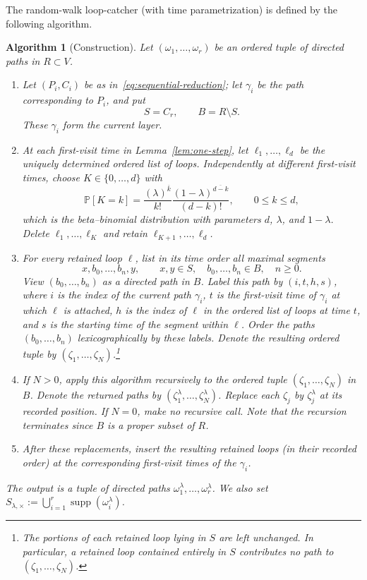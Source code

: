 \documentclass[11pt]{article}
\numberwithin{equation}{section}
\newcommand{\1}{\mathbf{1}}
\newtheorem{algorithm}[theorem]{Algorithm}
\newcommand{\supp}{\operatorname{supp}}
\newcommand{\Prob}{\mathbb P}
\begin{document}
The random-walk loop-catcher (with time parametrization) is defined by the following algorithm.
\begin{algorithm}[Construction]
\label{alg:time-catcher} Let $(\omega_1,\ldots,\omega_r)$ be an ordered tuple of directed paths in $R\subset V$.

\begin{enumerate}[label=\textup{(\arabic*)},leftmargin=2.4em]
\item Let $(P_i,C_i)$ be as in~\eqref{eq:sequential-reduction}; let $\gamma_i$
be the path corresponding to $P_i$, and put
\[
 S=C_r,\qquad B=R\setminus S.
\]
These $\gamma_i$ form the current layer.\label{alg:1}

\item At each first-visit time in Lemma~\ref{lem:one-step}, let
$\ell_1,\ldots,\ell_d$ be the uniquely determined ordered list of loops.  Independently
at different first-visit times, choose $K\in\{0,\ldots,d\}$ with
\begin{equation}\label{eq:initial-block-law}
 \Prob[K=k]
 =\frac{(\lambda)^{\overline k}}{k!}
  \frac{(1-\lambda)^{\overline{d-k}}}{(d-k)!},
 \qquad 0\le k\le d,
\end{equation}
which is the beta--binomial distribution with parameters $d$, $\lambda$, and $1-\lambda$.
Delete $\ell_1,\ldots,\ell_K$ and retain
$\ell_{K+1},\ldots,\ell_d$.\label{alg:2}

\item For every retained loop $\ell$, list in its time order all maximal
segments
\[
 x,b_0,\ldots,b_n,y,
 \qquad x,y\in S,\quad b_0,\ldots,b_n\in B,\quad n\ge0.
\]
View $(b_0,\ldots,b_n)$ as a directed path in $B$. Label
this path by $(i,t,h,s)$, where $i$ is the index of the current path
$\gamma_i$, $t$ is the first-visit time of $\gamma_i$ at which $\ell$ is
attached, $h$ is the index of $\ell$ in the ordered list of loops at time $t$, and $s$ is the starting time of the segment within $\ell$. Order the paths $(b_0,\ldots,b_n)$ lexicographically by these
labels. Denote the resulting ordered tuple by
$(\zeta_1,\ldots,\zeta_N)$.\footnote{The portions of each retained loop lying in $S$ are left unchanged. In particular, a retained loop contained entirely in $S$ contributes no path to $(\zeta_1,\ldots,\zeta_N)$.}\label{alg:3}

\item If $N>0$, apply this algorithm recursively to the ordered
tuple $(\zeta_1,\ldots,\zeta_N)$ in $B$.  Denote the returned paths by
$(\zeta_1^\lambda,\ldots,\zeta_N^\lambda)$.  Replace each $\zeta_j$ by
$\zeta_j^\lambda$ at its recorded position.  If $N=0$, make no recursive
call. Note that the recursion terminates since $B$ is a proper subset of $R$.

\item After these replacements, insert the resulting retained loops (in their recorded order) at the corresponding first-visit times of the
$\gamma_i$.
\end{enumerate}

The output is a tuple of directed paths
$\omega_1^\lambda,\ldots,\omega_r^\lambda$. We also set $S_{\lambda,\times}:=\bigcup_{i=1}^r\supp(\omega_i^\lambda)$.
\end{algorithm}
\end{document}
